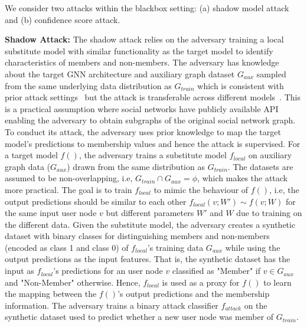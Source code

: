 We consider two attacks within the blackbox setting: (a) shadow model attack and (b) confidence score attack.

\noindent\textbf{Shadow Attack:} The shadow attack relies on the adversary training a local substitute model with similar functionality as the target model to identify characteristics of members and non-members.
The adversary has knowledge about the target GNN architecture and auxiliary graph dataset $G_{aux}$ sampled from the same underlying data distribution as $G_{train}$ which is consistent with prior attack settings~\cite{membershipinf,attributeinf,attributeinf2,logan} but the attack is transferable across different models~\cite{ndss19salem}.
This is a practical assumption where social networks have publicly available API enabling the adversary to obtain subgraphs of the original social network graph.
To conduct its attack, the adversary uses prior knowledge to map the target model's predictions to membership values and hence the attack is supervised.
For a target model $f()$, the adversary trains a substitute model $f_{local}$ on auxiliary graph data ($G_{aux}$) drawn from the same distribution as $G_{train}$.
The datasets are assumed to be non-overlapping, i.e, $G_{train} \cap G_{aux} = \phi$, which makes the attack more practical.
The goal is to train $f_{local}$ to mimic the behaviour of $f()$, i.e, the output predictions should be similar to each other $f_{local}(v;W') \sim f(v;W)$ for the same input user node $v$ but different parameters $W'$ and $W$ due to training on the different data.
Given the substitute model, the adversary creates a synthetic dataset with binary classes for distinguishing members and non-members (encoded as class 1 and class 0) of $f_{local}$'s training data $G_{aux}$ while using the output predictions as the input features.
That is, the synthetic dataset has the input as $f_{local}$'s predictions for an user node $v$ classified as "Member" if $v \in G_{aux}$ and "Non-Member" otherwise.
Hence, $f_{local}$ is used as a proxy for $f()$ to learn the mapping between the $f()$'s output predictions and the membership information.
The adversary trains a binary attack classifier $f_{attack}$ on the synthetic dataset used to predict whether a new user node was member of $G_{train}$.\\


